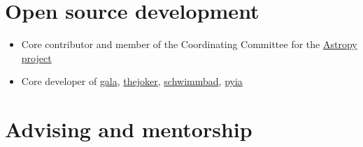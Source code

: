 \documentclass[12pt, letterpaper]{apw-cv}
\begin{document}
\begin{itemize}

\end{itemize}


\section*{Open source development \href{https://github.com/adrn}{\faGithub}}

\begin{itemize}

	\item Core contributor and member of the Coordinating Committee for the \href{http://www.astropy.org/}{Astropy project}
	\item Core developer of
        \href{http://gala.adrian.pw}{gala},
        \href{https://github.com/adrn/thejoker}{thejoker},
        \href{https://github.com/adrn/schwimmbad}{schwimmbad},
        \href{https://github.com/adrn/pyia}{pyia}

\end{itemize}


\section*{Advising and mentorship}
\end{document}
